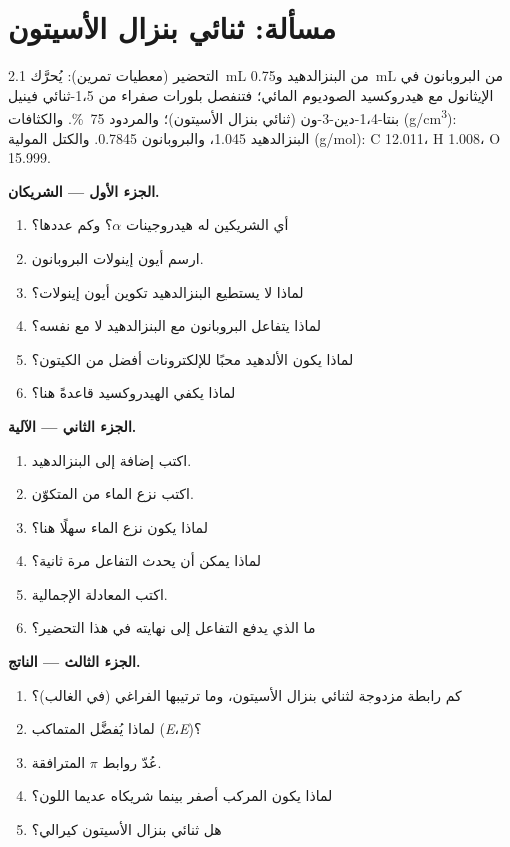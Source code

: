 \section{مسألة: ثنائي بنزال الأسيتون}

\begin{problem}
\label{pb:b2:enolates-aldol:1}
التحضير (معطيات تمرين): يُحرَّك \qty{2.1}{mL} من البنزالدهيد و\qty{0.75}{mL} من البروبانون
في الإيثانول مع هيدروكسيد الصوديوم المائي؛ فتنفصل بلورات صفراء من 1،5-ثنائي فينيل بنتا-1،4-دين-3-ون
(ثنائي بنزال الأسيتون)؛ والمردود 75~\%. والكثافات (\unit{g/cm^3}): البنزالدهيد 1.045، والبروبانون 0.7845.
والكتل المولية (\unit{g/mol}): C 12.011، H 1.008، O 15.999.

\medskip
\noindent\textbf{الجزء الأول --- الشريكان.}
\begin{enumerate}
  \item أي الشريكين له هيدروجينات $\alpha$؟ وكم عددها؟
  \item ارسم أيون إينولات البروبانون.
  \item لماذا لا يستطيع البنزالدهيد تكوين أيون إينولات؟
  \item لماذا يتفاعل البروبانون مع البنزالدهيد لا مع نفسه؟
  \item لماذا يكون الألدهيد محبًا للإلكترونات أفضل من الكيتون؟
  \item لماذا يكفي الهيدروكسيد قاعدةً هنا؟
\end{enumerate}

\medskip
\noindent\textbf{الجزء الثاني --- الآلية.}
\begin{enumerate}[resume]
  \item اكتب إضافة  إلى البنزالدهيد.
  \item اكتب نزع الماء من  المتكوّن.
  \item لماذا يكون نزع الماء سهلًا هنا؟
  \item لماذا يمكن أن يحدث التفاعل مرة ثانية؟
  \item اكتب المعادلة الإجمالية.
  \item ما الذي يدفع التفاعل إلى نهايته في هذا التحضير؟
\end{enumerate}

\medskip
\noindent\textbf{الجزء الثالث --- الناتج.}
\begin{enumerate}[resume]
  \item كم رابطة مزدوجة  لثنائي بنزال الأسيتون، وما ترتيبها الفراغي (في الغالب)؟
  \item لماذا يُفضَّل المتماكب (\textit{E}،\textit{E})؟
  \item عُدّ روابط $\pi$ المترافقة.
  \item لماذا يكون المركب أصفر بينما شريكاه عديما اللون؟
  \item هل ثنائي بنزال الأسيتون كيرالي؟
\end{enumerate}


\end{problem}
